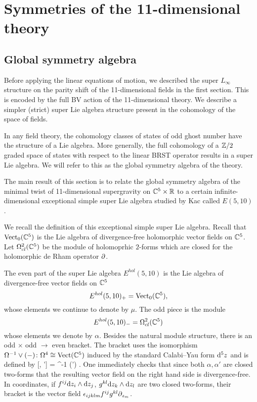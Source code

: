 
\section{Symmetries of the 11-dimensional theory}
\label{sec:symmetry}

\subsection{Global symmetry algebra}
\label{sec:global}

Before applying the linear equations of motion, we described the super $L_\infty$ structure on the parity shift of the 11-dimensional fields in the first section. 
This is encoded by the full BV action of the 11-dimensional theory.
We describe a simpler (strict) super Lie algebra structure present in the cohomology of the space of fields.

In any field theory, the cohomology classes of states of odd ghost number have the structure of a Lie algebra. 
More generally, the full cohomology of a $\mathbb Z/2$ graded space of states with respect to the linear BRST operator results in a super Lie algebra. 
We will refer to this as the global symmetry algebra of the theory.

The main result of this section is to relate the global symmetry algebra of the minimal twist of 11-dimensional supergravity on $\mathbb C^5 \times \mathbb R$ to a certain infinite-dimensional exceptional simple super Lie algebra studied by Kac \cite{KacClass,KR} called $E(5,10)$.

We recall the definition of this exceptional simple super Lie algebra.
Recall that ${\rm Vect}_0 (\mathbb C^5)$ is the Lie algebra of divergence-free holomorphic vector fields on $\mathbb C^5$.
Let $\Omega^{2}_{cl} (\mathbb C^5)$ be the module of holomoprhic $2$-forms which are closed for the holomorphic de Rham operator $\partial$.

The even part of the super Lie algebra $E^{hol}(5,10)$ is the Lie algebra of divergence-free vector fields on $\mathbb C^5$
\[
E^{hol}(5,10)_+ = {\rm Vect}_0(\mathbb C^5) ,
\]
whose elements we continue to denote by $\mu$. 
The odd piece is the module 
\[
E^{hol}(5,10)_- = \Omega^{2}_{cl} (\mathbb C^5) 
\]
whose elements we denote by $\alpha$. 
Besides the natural module structure, there is an odd $\times$ odd $\to$ even bracket. 
The bracket uses the isomorphism $\Omega^{-1} \vee (-) \colon \Omega^{4} \cong {\rm Vect} (\mathbb C^5)$ induced by the standard Calabi--Yau form ${\rm d}^5 z$ and is defined by
\beqn\label{eqn:e510}
[\alpha, \alpha'] = \Omega^{-1} \vee (\alpha \wedge \alpha') .
\eeqn
One immediately checks that since both $\alpha, \alpha'$ are closed two-forms that the resulting vector field on the right hand side is divergence-free. 
In coordinates, if $f^{ij} {\rm d} z_i \wedge {\rm d} z_j$, $g^{kl} {\rm d} z_k \wedge {\rm d} z_l$ are two closed two-forms, their bracket is the vector field $\epsilon_{ijklm} f^{ij}g^{kl} \partial_{z_m}$. 

